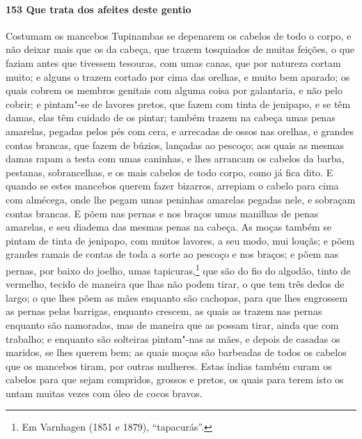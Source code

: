 \begin{linenumbers}
\paragraph{153 Que trata dos afeites deste gentio}\quad
Costumam os mancebos Tupinambas se depenarem os cabelos de todo o corpo, e não deixar
mais que os da cabeça, que trazem tosquiados de muitas feições, o que faziam antes que
tivessem tesouras, com umas canas, que por natureza cortam muito; e alguns o trazem
cortado por cima das orelhas, e muito bem aparado; os quais cobrem os membros genitais com
alguma coisa por galantaria, e não pelo cobrir; e pintam"-se de lavores pretos, que fazem
com tinta de jenipapo, e se têm damas, elas têm cuidado de os pintar; também trazem na
cabeça umas penas amarelas, pegadas pelos pés com cera, e arrecadas de ossos nas orelhas,
e grandes contas brancas, que fazem de búzios, lançadas ao pescoço; aos quais as mesmas
damas rapam a testa com umas caninhas, e lhes arrancam os cabelos da barba, pestanas,
sobrancelhas, e os mais cabelos de todo corpo, como já fica dito. E quando se estes
mancebos querem fazer bizarros, arrepiam o cabelo para cima com almécega, onde lhe pegam
umas peninhas amarelas pegadas nele, e sobraçam contas brancas. E põem nas pernas e nos
braços umas manilhas de penas amarelas, e seu diadema das mesmas penas na cabeça. As moças
também se pintam de tinta de jenipapo, com muitos lavores, a seu modo, mui louçãs; e põem
grandes ramais de contas de toda a sorte ao pescoço e nos braços; e põem nas pernas, por
baixo do joelho, umas tapicuras,\footnote{ Em Varnhagen (1851 e 1879), ``tapacurás''.} que
são do fio do algodão, tinto de vermelho, tecido de maneira que lhas não podem tirar, o
que tem três dedos de largo; o que lhes põem as mães enquanto são cachopas, para que lhes
engrossem as pernas pelas barrigas, enquanto crescem, as quais as trazem nas pernas
enquanto são namoradas, mas de maneira que as possam tirar, ainda que com trabalho; e
enquanto são solteiras pintam"-nas as mães, e depois de casadas os maridos, se lhes querem
bem; as quais moças são barbeadas de todos os cabelos que os mancebos tiram, por outras
mulheres. Estas índias também curam os cabelos para que sejam compridos, grossos e pretos,
os quais para terem isto os untam muitas vezes com óleo de cocos bravos.


\end{linenumbers}
